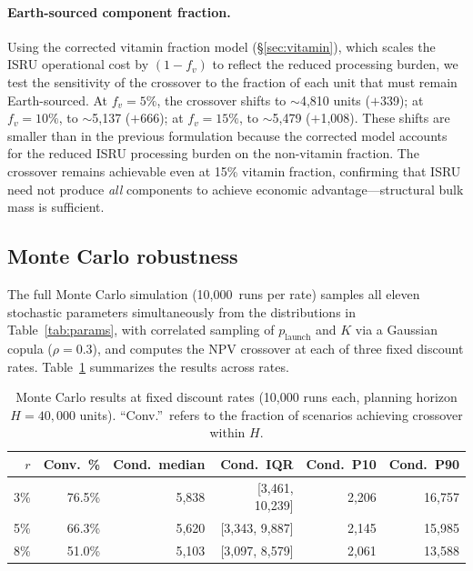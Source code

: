 \documentclass[preprint,12pt]{elsarticle}
\begin{document}
\paragraph{Earth-sourced component fraction.} Using the corrected vitamin fraction model (\S\ref{sec:vitamin}), which scales the ISRU operational cost by $(1 - f_v)$ to reflect the reduced processing burden, we test the sensitivity of the crossover to the fraction of each unit that must remain Earth-sourced. At $f_v = 5\%$, the crossover shifts to $\sim$4{,}810 units ($+$339); at $f_v = 10\%$, to $\sim$5{,}137 ($+$666); at $f_v = 15\%$, to $\sim$5{,}479 ($+$1{,}008). These shifts are smaller than in the previous formulation because the corrected model accounts for the reduced ISRU processing burden on the non-vitamin fraction. The crossover remains achievable even at 15\% vitamin fraction, confirming that ISRU need not produce \emph{all} components to achieve economic advantage---structural bulk mass is sufficient.

\subsection{Monte Carlo robustness}
\label{sec:mc_robustness}

The full Monte Carlo simulation (10{,}000~runs per rate) samples all eleven stochastic parameters simultaneously from the distributions in Table~\ref{tab:params}, with correlated sampling of $p_{\mathrm{launch}}$ and $K$ via a Gaussian copula ($\rho = 0.3$), and computes the NPV crossover at each of three fixed discount rates. Table~\ref{tab:mc_summary} summarizes the results across rates.

\begin{table}[htbp]
\centering
\caption{Monte Carlo results at fixed discount rates (10{,}000 runs each, planning horizon $H = 40{,}000$ units). ``Conv.''\ refers to the fraction of scenarios achieving crossover within $H$.}
\label{tab:mc_summary}
\small
\begin{tabular}{@{}rrrrrr@{}}
\toprule
$r$ & Conv.\ \% & Cond.\ median & Cond.\ IQR & Cond.\ P10 & Cond.\ P90 \\
\midrule
3\%  & 76.5\% & 5{,}838 & [3{,}461, 10{,}239] & 2{,}206 & 16{,}757 \\
5\%  & 66.3\% & 5{,}620 & [3{,}343, 9{,}887]  & 2{,}145 & 15{,}985 \\
8\%  & 51.0\% & 5{,}103 & [3{,}097, 8{,}579]  & 2{,}061 & 13{,}588 \\
\bottomrule
\end{tabular}
\end{table}
\end{document}
